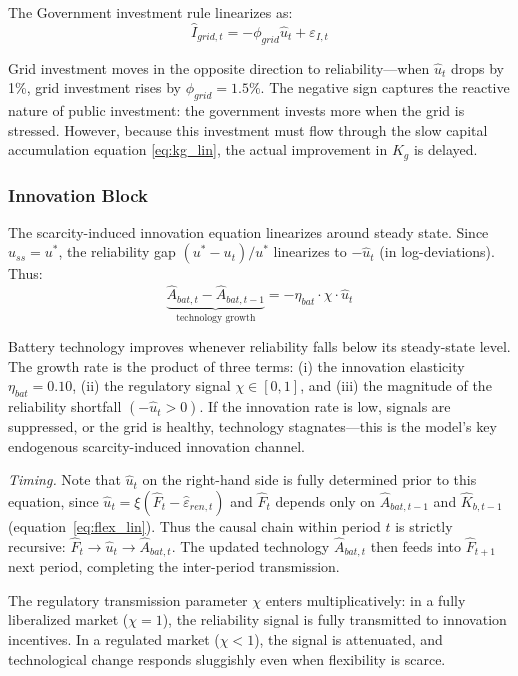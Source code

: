 \documentclass[12pt, a4paper]{article}
\begin{document}
The Government investment rule linearizes as:
\begin{equation}
\hat{I}_{grid,t} = -\phi_{grid} \hat{u}_t + \varepsilon_{I,t}
\label{eq:gridrule_lin}
\end{equation}

Grid investment moves in the opposite direction to reliability---when $\hat{u}_t$ drops by 1\%, grid investment rises by $\phi_{grid} = 1.5$\%. The negative sign captures the reactive nature of public investment: the government invests more when the grid is stressed. However, because this investment must flow through the slow capital accumulation equation \eqref{eq:kg_lin}, the actual improvement in $K_g$ is delayed.

\subsubsection{Innovation Block}

The scarcity-induced innovation equation linearizes around steady state. Since $u_{ss} = u^*$, the reliability gap $(u^* - u_t)/u^*$ linearizes to $-\hat{u}_t$ (in log-deviations). Thus:
\begin{equation}
\underbrace{\hat{A}_{bat,t} - \hat{A}_{bat,t-1}}_{\text{technology growth}} = -\eta_{bat} \cdot \chi \cdot \hat{u}_t
\label{eq:abat_lin}
\end{equation}

Battery technology improves whenever reliability falls below its steady-state level. The growth rate is the product of three terms: (i) the innovation elasticity $\eta_{bat} = 0.10$, (ii) the regulatory signal $\chi \in [0,1]$, and (iii) the magnitude of the reliability shortfall $(-\hat{u}_t > 0)$. If the innovation rate is low, signals are suppressed, or the grid is healthy, technology stagnates---this is the model's key endogenous scarcity-induced innovation channel.

\noindent \textit{Timing.} Note that $\hat{u}_t$ on the right-hand side is fully determined prior to this equation, since $\hat{u}_t = \xi(\hat{F}_t - \hat{\varepsilon}_{ren,t})$ and $\hat{F}_t$ depends only on $\hat{A}_{bat,t-1}$ and $\hat{K}_{b,t-1}$ (equation~\ref{eq:flex_lin}). Thus the causal chain within period $t$ is strictly recursive: $\hat{F}_t \to \hat{u}_t \to \hat{A}_{bat,t}$. The updated technology $\hat{A}_{bat,t}$ then feeds into $\hat{F}_{t+1}$ next period, completing the inter-period transmission.

The regulatory transmission parameter $\chi$ enters multiplicatively: in a fully liberalized market ($\chi = 1$), the reliability signal is fully transmitted to innovation incentives. In a regulated market ($\chi < 1$), the signal is attenuated, and technological change responds sluggishly even when flexibility is scarce.
\end{document}
